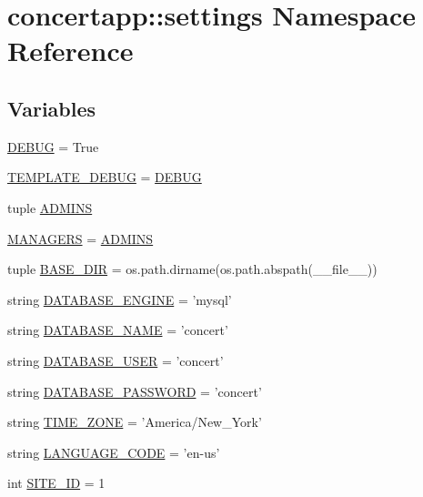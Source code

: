 \hypertarget{namespaceconcertapp_1_1settings}{
\section{concertapp::settings Namespace Reference}
\label{namespaceconcertapp_1_1settings}
}
\subsection*{Variables}
\begin{DoxyCompactItemize}
\item 
\hyperlink{namespaceconcertapp_1_1settings_aa7a7fa212cddbad6c0e890b04def0d99}{DEBUG} = True
\item 
\hyperlink{namespaceconcertapp_1_1settings_aec129365a35dbd3f95c063e3eabc25d9}{TEMPLATE\_\-DEBUG} = \hyperlink{namespaceconcertapp_1_1settings_aa7a7fa212cddbad6c0e890b04def0d99}{DEBUG}
\item 
tuple \hyperlink{namespaceconcertapp_1_1settings_a8d3a4e4513fc897541b683017c482186}{ADMINS}
\item 
\hyperlink{namespaceconcertapp_1_1settings_aea76c801264e2623a65bd856d84bb818}{MANAGERS} = \hyperlink{namespaceconcertapp_1_1settings_a8d3a4e4513fc897541b683017c482186}{ADMINS}
\item 
tuple \hyperlink{namespaceconcertapp_1_1settings_a885ea24527143834f9d5b4a14176ffd0}{BASE\_\-DIR} = os.path.dirname(os.path.abspath(\_\-\_\-file\_\-\_\-))
\item 
string \hyperlink{namespaceconcertapp_1_1settings_af522d15c4d99b4a69ffa7c67722902e1}{DATABASE\_\-ENGINE} = 'mysql'
\item 
string \hyperlink{namespaceconcertapp_1_1settings_a4d86bb87bfe8f05c81b33104e66b797a}{DATABASE\_\-NAME} = 'concert'
\item 
string \hyperlink{namespaceconcertapp_1_1settings_a57accf2798f7427aa7cb7d8fb4f5663c}{DATABASE\_\-USER} = 'concert'
\item 
string \hyperlink{namespaceconcertapp_1_1settings_ae3b50de34ebfe4e39909618a15937fdf}{DATABASE\_\-PASSWORD} = 'concert'
\item 
string \hyperlink{namespaceconcertapp_1_1settings_a512e2a904213044a63a0ff25c00c99c0}{TIME\_\-ZONE} = 'America/New\_\-York'
\item 
string \hyperlink{namespaceconcertapp_1_1settings_ab73877b42d35dadee56c05eb29b51642}{LANGUAGE\_\-CODE} = 'en-\/us'
\item 
int \hyperlink{namespaceconcertapp_1_1settings_a257dac3a040b91223f0947be327d8872}{SITE\_\-ID} = 1

\end{DoxyCompactItemize}
